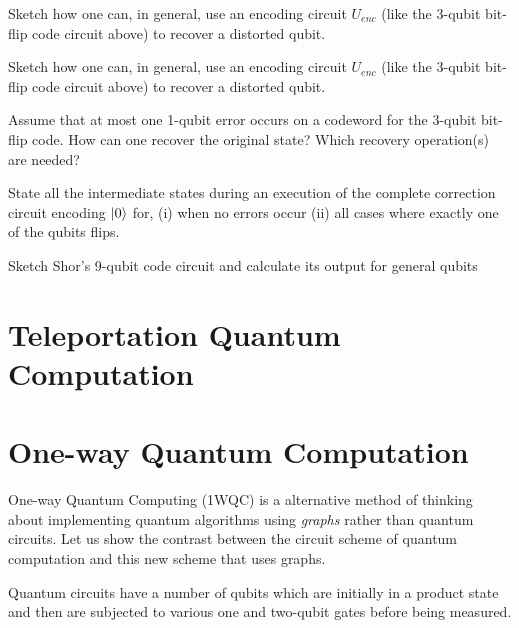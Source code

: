\frmrule

\begin{example}
Sketch how one can, in general, use an encoding circuit $U_{enc}$ (like 
the 3-qubit bit-flip code circuit above) to recover a distorted qubit. 
\end{example}

\frmrule

\begin{example}
Sketch how one can, in general, use an encoding circuit $U_{enc}$ (like 
the 3-qubit bit-flip code circuit above) to recover a distorted qubit. 
\end{example}

\frmrule

\begin{example}
Assume that at most one 1-qubit error occurs on a codeword for the 3-qubit 
bit-flip code. How can one recover the original state? Which recovery 
operation(s) are needed? 

State all the intermediate states during an execution of the complete 
correction circuit encoding $\left|0\right\rangle$ for, (i) when no errors occur
(ii) all cases where exactly one of the qubits flips.
\end{example}

\frmrule

\begin{example}
Sketch Shor's 9-qubit code circuit and calculate its output for general qubits
\end{example}




\section{Teleportation Quantum Computation}


\section{One-way Quantum Computation}


One-way Quantum Computing (1WQC) is a alternative method of thinking about 
implementing quantum algorithms using \textit{graphs} rather than quantum circuits. 
Let us show the contrast between the circuit scheme of quantum computation 
and this new scheme that uses graphs. 

Quantum circuits have a number of qubits which are initially in a
product state and then are subjected to various one and two-qubit gates before 
being measured.


